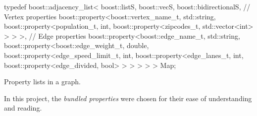 \documentclass[../main.tex]{subfiles}
\begin{document}
\begin{mylisting}
\begin{cppcode}
typedef boost::adjacency_list<
    boost::listS, boost::vecS, boost::bidirectionalS,
    // Vertex properties
    boost::property<boost::vertex_name_t, std::string,
    boost::property<population_t, int,
    boost::property<zipcodes_t, std::vector<int> > > >,
    // Edge properties
    boost::property<boost::edge_name_t, std::string,
    boost::property<boost::edge_weight_t, double,
    boost::property<edge_speed_limit_t, int,
    boost::property<edge_lanes_t, int,
    boost::property<edge_divided, bool> > > > > >
  Map;

\end{cppcode}
\caption{Property lists in a graph.}
\label{lst:boost-properties-list}
\end{mylisting}

In this project, the \textit{bundled properties} were chosen for their ease of understanding and reading. 
\end{document}
